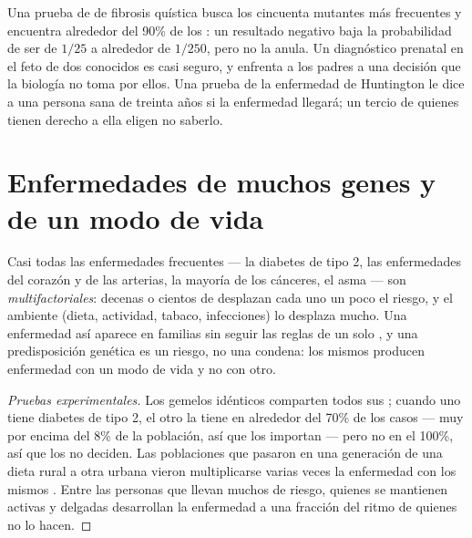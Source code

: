 \begin{example}\label{ex:g11:genes-and-disease:testsays}
Una prueba de  de fibrosis quística busca los cincuenta
 mutantes más frecuentes y encuentra alrededor del 90\% de los
: un resultado negativo baja la probabilidad de ser 
de $1/25$ a alrededor de $1/250$, pero no la anula. Un diagnóstico
prenatal en el feto de dos  conocidos es casi seguro, y
enfrenta a los padres a una decisión que la biología no toma por ellos.
Una prueba de la enfermedad de Huntington le dice a una persona sana de
treinta años si la enfermedad llegará; un tercio de quienes tienen
derecho a ella eligen no saberlo.
\end{example}

\section{Enfermedades de muchos genes y de un modo de vida}

\begin{proposition}\label{prop:g11:genes-and-disease:multifactorial}
Casi todas las enfermedades frecuentes --- la diabetes de tipo 2, las
enfermedades del corazón y de las arterias, la mayoría de los cánceres,
el asma --- son
\emph{multifactoriales}: decenas o
cientos de  desplazan cada uno un poco el riesgo, y el ambiente
(dieta, actividad, tabaco, infecciones) lo desplaza mucho. Una
enfermedad así aparece en familias sin seguir las reglas de un solo
, y una predisposición genética es un riesgo, no una condena: los
mismos  producen enfermedad con un modo de vida y no con otro.
\end{proposition}
\begin{proof}[Pruebas experimentales]
Los gemelos idénticos comparten todos sus ; cuando uno tiene
diabetes de tipo 2, el otro la tiene en alrededor del 70\% de los casos
--- muy por encima del 8\% de la población, así que los  importan
--- pero no en el 100\%, así que los  no deciden. Las poblaciones
que pasaron en una generación de una dieta rural a otra urbana vieron
multiplicarse varias veces la enfermedad con los mismos . Entre
las personas que llevan muchos  de riesgo, quienes se mantienen
activas y delgadas desarrollan la enfermedad a una fracción del ritmo
de quienes no lo hacen.
\end{proof}

